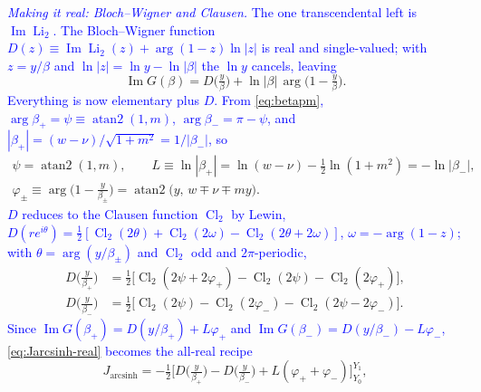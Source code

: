 \documentclass[11pt]{article}
\numberwithin{equation}{section}
\newcommand{\half}{\tfrac{1}{2}}
\DeclareMathOperator{\arcsinh}{arcsinh}
\newcommand{\cam}[1]{\textcolor{blue}{#1}}
\begin{document}
\cam{\emph{Making it real: Bloch--Wigner and Clausen.} The one transcendental left is
$\operatorname{Im}\operatorname{Li}_2$. The Bloch--Wigner function $D(z)\equiv\operatorname{Im}
\operatorname{Li}_2(z)+\arg(1-z)\ln|z|$ is real and single-valued; with $z=y/\beta$ and $\ln|z|=\ln y
-\ln|\beta|$ the $\ln y$ cancels, leaving}
\begin{equation}\label{eq:ImG-D}
  \operatorname{Im}G(\beta)=D\!\big(\tfrac{y}{\beta}\big)+\ln|\beta|\,\arg\!\big(1-\tfrac{y}{\beta}\big).
\end{equation}
\cam{Everything is now elementary plus $D$. From \eqref{eq:betapm}, $\arg\beta_+=\psi\equiv
\operatorname{atan2}(1,m)$, $\arg\beta_-=\pi-\psi$, and $|\beta_+|=(w-\nu)/\sqrt{1+m^2}=1/|\beta_-|$, so}
\begin{equation}\label{eq:clausen-params}
\begin{gathered}
  \psi=\operatorname{atan2}(1,m),\qquad L\equiv\ln|\beta_+|=\ln(w-\nu)-\tfrac12\ln(1+m^2)=-\ln|\beta_-|,\\
  \varphi_\pm\equiv\arg\!\big(1-\tfrac{y}{\beta_\pm}\big)=\operatorname{atan2}\big(y,\,w\mp\nu\mp my\big).
\end{gathered}
\end{equation}
\cam{$D$ reduces to the Clausen function $\operatorname{Cl}_2$ by Lewin, $D(re^{i\theta})=\half
[\operatorname{Cl}_2(2\theta)+\operatorname{Cl}_2(2\omega)-\operatorname{Cl}_2(2\theta+2\omega)]$,
$\omega=-\arg(1-z)$; with $\theta=\arg(y/\beta_\pm)$ and $\operatorname{Cl}_2$ odd and $2\pi$-periodic,}
\begin{equation}\label{eq:D-clausen}
\begin{aligned}
  D\!\big(\tfrac{y}{\beta_+}\big)&=\half\big[\operatorname{Cl}_2(2\psi+2\varphi_+)-\operatorname{Cl}_2(2\psi)
  -\operatorname{Cl}_2(2\varphi_+)\big],\\
  D\!\big(\tfrac{y}{\beta_-}\big)&=\half\big[\operatorname{Cl}_2(2\psi)-\operatorname{Cl}_2(2\varphi_-)
  -\operatorname{Cl}_2(2\psi-2\varphi_-)\big].
\end{aligned}
\end{equation}
\cam{Since $\operatorname{Im}G(\beta_+)=D(y/\beta_+)+L\varphi_+$ and $\operatorname{Im}G(\beta_-)
=D(y/\beta_-)-L\varphi_-$, \eqref{eq:Jarcsinh-real} becomes the all-real recipe}
\begin{equation}\label{eq:Jarcsinh-clausen}
  J_{\arcsinh}=-\half\Big[D\!\big(\tfrac{y}{\beta_+}\big)-D\!\big(\tfrac{y}{\beta_-}\big)
  +L(\varphi_++\varphi_-)\Big]_{Y_0}^{Y_1},
\end{equation}
\end{document}
